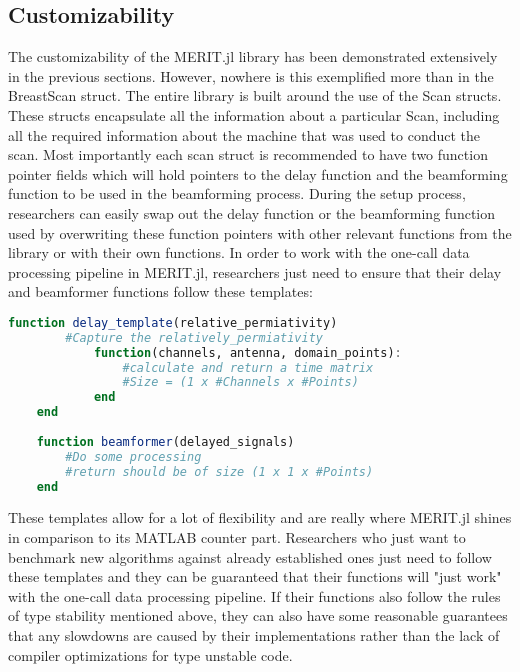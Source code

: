 \subsection{Customizability}
The customizability of the MERIT.jl library has been demonstrated extensively in the previous sections. However, nowhere
is this exemplified more than in the BreastScan struct. The entire library is built around the use of the Scan structs.
These structs encapsulate all the information about a particular Scan, including all the required information about the
machine that was used to conduct the scan. Most importantly each scan struct is recommended to have two function pointer
fields which will hold pointers to the delay function and the beamforming function to be used in the beamforming
process. During the setup process, researchers can easily swap out the delay function or the beamforming function used
by overwriting these function pointers with other relevant functions from the library or with their own functions. In
order to work with the one-call data processing pipeline in MERIT.jl, researchers just need to ensure that their delay
and beamformer functions follow these templates:
\begin{lstlisting}[language=Julia]
    function delay_template(relative_permiativity)
        #Capture the relatively_permiativity
            function(channels, antenna, domain_points):
                #calculate and return a time matrix
                #Size = (1 x #Channels x #Points)
            end
    end
    
    function beamformer(delayed_signals)
        #Do some processing
        #return should be of size (1 x 1 x #Points)
    end
\end{lstlisting}
These templates allow for a lot of flexibility and are really where MERIT.jl shines in comparison to its MATLAB counter
part. Researchers who just want to benchmark new algorithms against already established ones just need to follow these
templates and they can be guaranteed that their functions will "just work" with the one-call data processing pipeline.
If their functions also follow the rules of type stability mentioned above, they can also have some reasonable
guarantees that any slowdowns are caused by their implementations rather than the lack of compiler optimizations for
type unstable code. 